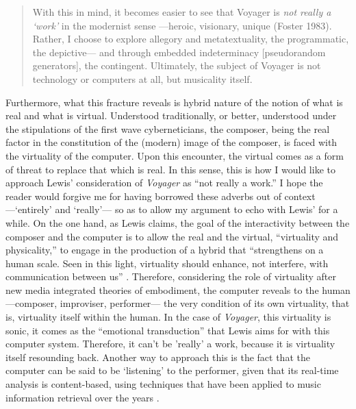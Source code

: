 \begin{quote}
	With this in mind, it becomes easier to see that Voyager is \textit{not really a `work'} in the modernist sense ---heroic, visionary, unique (Foster 1983). Rather, I choose to explore allegory and metatextuality, the programmatic, the depictive--- and through embedded indeterminacy [pseudorandom generators], the contingent. Ultimately, the subject of Voyager is not technology or computers at all, but musicality itself. \im \parencite[110]{Lew99:Int}
\end{quote}

Furthermore, what this fracture reveals is hybrid nature of the notion of what is real and what is virtual. Understood traditionally, or better, understood under the stipulations of the first wave cyberneticians, the composer, being the real factor in the constitution of the (modern) image of the composer, is faced with the virtuality of the computer. Upon this encounter, the virtual comes as a form of threat to replace that which is real. In this sense, this is how I would like to approach Lewis' consideration of \textit{Voyager} as ``not really a work.'' I hope the reader would forgive me for having borrowed these adverbs out of context ---`entirely' and `really'--- so as to allow my argument to echo with Lewis' for a while. On the one hand, as Lewis claims, the goal of the interactivity between the composer and the computer is to allow the real and the virtual, ``virtuality and physicality,'' to engage in the production of a hybrid that ``strengthens on a human scale. Seen in this light, virtuality should enhance, not interfere, with communication between us'' \parencite[110]{Lew99:Int}. Therefore, considering the role of virtuality after new media integrated theories of embodiment, the computer reveals to the human ---composer, improviser, performer--- the very condition of its own virtuality, that is, virtuality itself within the human. In the case of \textit{Voyager}, this virtuality is sonic, it comes as the ``emotional transduction'' that Lewis aims for with this computer system. Therefore, it can't be 'really' a work, because it is virtuality itself resounding back. Another way to approach this is the fact that the computer can be said to be `listening' to the performer, given that its real-time analysis is content-based, using techniques that have been applied to music information retrieval over the years . 

